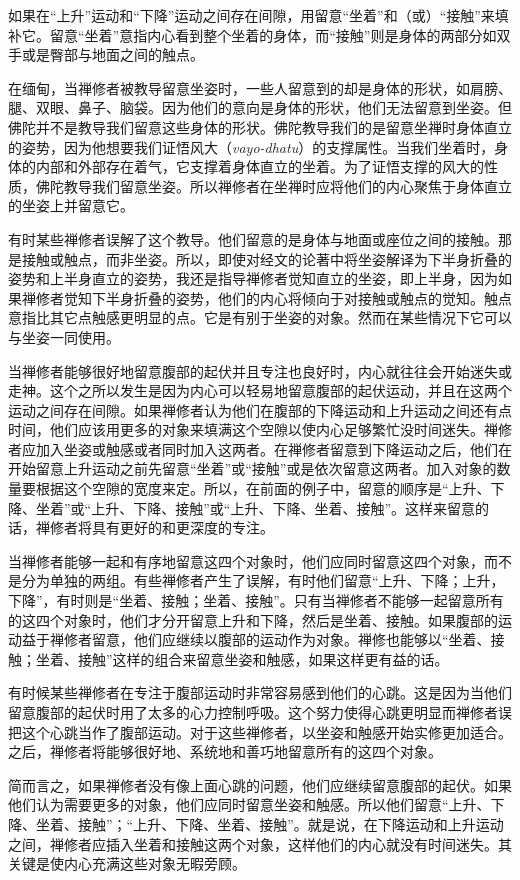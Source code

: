如果在“上升”运动和“下降”运动之间存在间隙，用留意“坐着”和（或）“接触”来填补它。留意“坐着”意指内心看到整个坐着的身体，而“接触”则是身体的两部分如双手或是臀部与地面之间的触点。

在缅甸，当禅修者被教导留意坐姿时，一些人留意到的却是身体的形状，\1如肩膀、腿、双眼、鼻子、脑袋。因为他们的意向是身体的形状，他们无法留意到坐姿。但佛陀并不是教导我们留意这些身体的形状。佛陀教导我们的是留意坐禅时身体直立的姿势，因为他想要我们证悟风大（{\it vayo-dhatu}）的支撑属性。当我们坐着时，身体的内部和外部存在着气，它支撑着身体直立的坐着。为了证悟支撑的风大的性质，佛陀教导我们留意坐姿。所以禅修者在坐禅时应将他们的内心聚焦于身体直立的坐姿上并留意它。

有时某些禅修者误解了这个教导。他们留意的是身体与地面或座位之间的接触。那是接触或触点，而非坐姿。所以，即使对经文的论著中将坐姿解译为下半身折叠的姿势和上半身直立的姿势，我还是指导禅修者觉知直立的坐姿，即上半身，因为如果禅修者觉知下半身折叠的姿势，他们的内心将倾向于对接触或触点的觉知。触点意指比其它点触感更明显的点。它是有别于坐姿的对象。然而在某些情况下它可以与坐姿一同使用。

当禅修者能够很好地留意腹部的起伏并且专注也良好时，内心就往往会开始迷失或走神。这个之所以发生是因为内心可以轻易地留意腹部的起伏运动，并且在这两个运动之间存在间隙。如果禅修者认为他们\1在腹部的下降运动和上升运动之间还有点时间，他们应该用更多的对象来填满这个空隙以使内心足够繁忙没时间迷失。禅修者应加入坐姿或触感或者同时加入这两者。在禅修者留意到下降运动之后，他们在开始留意上升运动之前先留意“坐着”或“接触”或是依次留意这两者。加入对象的数量要根据这个空隙的宽度来定。所以，在前面的例子中，留意的顺序是“上升、下降、坐着”或“上升、下降、接触”或“上升、下降、坐着、接触”。这样来留意的话，禅修者将具有更好的和更深度的专注。

当禅修者能够一起和有序地留意这四个对象时，他们应同时留意这四个对象，而不是分为单独的两组。有些禅修者产生了误解，有时他们留意“上升、下降；上升，下降”，有时则是“坐着、接触；坐着、接触”。只有当禅修者不能够一起留意所有的这四个对象时，他们才分开留意上升和下降，然后是坐着、接触。如果腹部的运动益于禅修者留意，他们应继续以腹部的运动作为对象。禅修也能够以“坐着、接触；坐着、接触”这样的组合来留意坐姿和触感，如果这样更有益的话。

有时候某些禅修者在专注于腹部运动时非常容易感到他们的心跳。这是因为当他们留意腹部的起伏时用了太多的心力控制呼吸。这个努力使得心跳更明显而禅修者误把这个心跳当作了腹部运动。对于这些禅修者，以坐姿和触感\1开始实修更加适合。之后，禅修者将能够很好地、系统地和善巧地留意所有的这四个对象。

简而言之，如果禅修者没有像上面心跳的问题，他们应继续留意腹部的起伏。如果他们认为需要更多的对象，他们应同时留意坐姿和触感。所以他们留意“上升、下降、坐着、接触”；“上升、下降、坐着、接触”。就是说，在下降运动和上升运动之间，禅修者应插入坐着和接触这两个对象，这样他们的内心就没有时间迷失。其关键是使内心充满这些对象无暇旁顾。

